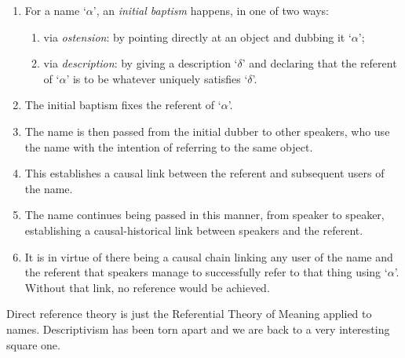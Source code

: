 \begin{definition}\leavevmode
\begin{enumerate}[label=\roman*.]
  \item For a name `$\alpha$', an \emph{initial baptism} happens, in one of two ways:
  \begin{enumerate}
    \item via \emph{ostension}: by pointing directly at an object and dubbing it `$\alpha$';
    \item via \emph{description}: by giving a description `$\delta$' and declaring that the referent of `$\alpha$' is to be whatever uniquely satisfies `$\delta$'.
  \end{enumerate}
  \item The initial baptism fixes the referent of `$\alpha$'.
  \item The name is then passed from the initial dubber to other speakers, who use the name with the intention of referring to the same object.
  \item This establishes a causal link between the referent and subsequent users of the name.
  \item The name continues being passed in this manner, from speaker to speaker, establishing a causal-historical link between speakers and the referent.
  \item It is in virtue of there being a causal chain linking any user of the name and the referent that speakers manage to successfully refer to that thing using `$\alpha$'. Without that link, no reference would be achieved.
\end{enumerate}
\end{definition}

Direct reference theory is just the Referential Theory of Meaning applied to names. Descriptivism has been torn apart and we are back to a very interesting square one.
